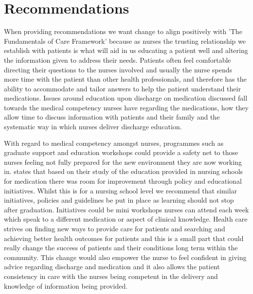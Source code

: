 \documentclass[british,12pt,a4paper]{article}
\begin{document}
	\section{Recommendations}
	When providing recommendations we want change to align positively with 'The Fundamentals of Care Framework' \parencite{Dempsey2013} because as nurses the trusting relationship we establish with patients is what will aid in us educating a patient well and altering the information given to address their needs. Patients often feel comfortable directing their questions to the nurses involved and usually the nurse spends more time with the patient than other health professionals, and therefore has the ability to accommodate and tailor answers to help the patient understand their medications. Issues around education upon discharge on medication discussed fall towards the medical competency nurses have regarding the medications, how they allow time to discuss information with patients and their family and the systematic way in which nurses deliver discharge education.
 
	With regard to medical competency amongst nurses, programmes such as graduate support and education workshops could provide a safety net to those nurses feeling not fully prepared for the new environment they are now working in. \citeauthor{Sulosaari2014} states that based on their study of the education provided in nursing schools for medication there was room for improvement through policy and educational initiatives. Whilst this is for a nursing school level we recommend that similar initiatives, policies and guidelines be put in place as learning should not stop after graduation. Initiatives could be mini workshops nurses can attend each week which speak to a different medication or aspect of clinical knowledge. Health care strives on finding new ways to provide care for patients and searching and achieving better health outcomes for patients and this is a small part that could really change the success of patients and their conditions long term within the community. This change would also empower the nurse to feel confident in giving advice regarding discharge and medication and it also allows the patient consistency in care with the nurses being competent in the delivery and knowledge of information being provided.
 
\end{document}
